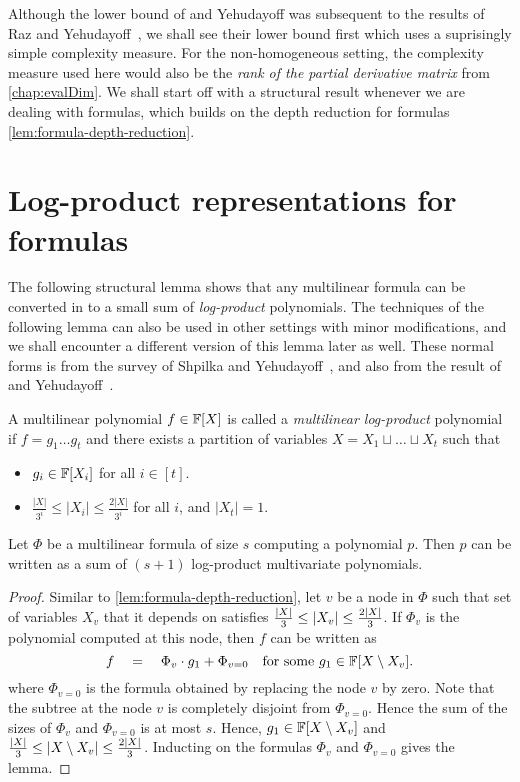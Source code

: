 Although the lower bound of \Hrubes and Yehudayoff was subsequent to the results of Raz and Yehudayoff~\cite{raz2004,raz-yehudayoff}, we shall see their lower bound first which uses a suprisingly simple complexity measure. For the non-homogeneous setting, the complexity measure used here would also be the \emph{rank of the partial derivative matrix} from \autoref{chap:evalDim}. We shall start off with a structural result whenever we are dealing with formulas, which builds on the depth reduction for formulas \autoref{lem:formula-depth-reduction}. 

\section{Log-product representations for formulas}

The following structural lemma shows that any multilinear formula can be converted in to a small sum of \emph{log-product} polynomials. 
The techniques of the following lemma can also be used in other settings with minor modifications, and we shall encounter a different version of this lemma later as well.
These normal forms is from the survey of Shpilka and Yehudayoff~\cite{sy}, and also from the result of \Hrubes and Yehudayoff~\cite{HY11a}. 

\begin{definition}\label{defn:mult-logproduct}
  A multilinear polynomial $f\in \mathbb{F}[X]$ is called a \emph{multilinear log-product} polynomial if $f = g_1\dots g_t$ and there exists a partition of variables $X = X_1 \sqcup \dots \sqcup X_t$ such that
  \begin{itemize}
  \item $g_i \in \mathbb{F}[X_i]$ for all $i \in [t]$.
  \item $\frac{|X|}{3^i} \leq |X_i| \leq \frac{2|X|}{3^i}$ for all
    $i$, and $|X_t| = 1$.
  \end{itemize}
\end{definition}

\begin{lemma}\label{lem:mult-logproduct}
  Let $\Phi$ be a multilinear formula of size $s$ computing a polynomial $p$. 
Then $p$ can be written as a sum of $(s+1)$ log-product multivariate polynomials.
\end{lemma}
\begin{proof}
  Similar to \autoref{lem:formula-depth-reduction}, let $v$ be a node in $\Phi$ such that set of variables $X_v$ that it depends on satisfies $\frac{|X|}{3} \leq \left|X_v\right| \leq \frac{2|X|}{3}$. 
If $\Phi_v$ is the polynomial computed at this node, then $f$ can be written as
  $$
  f \quad = \quad \Phi_v \cdot g_1 + \Phi_{v=0} \quad\text{for some $g_1 \in \mathbb{F}[X\setminus X_v]$}.
  $$
  where $\Phi_{v=0}$ is the formula obtained by replacing the node $v$ by zero. 
Note that the subtree at the node $v$ is completely disjoint from $\Phi_{v=0}$. 
Hence the sum of the sizes of $\Phi_v$ and $\Phi_{v=0}$ is at most $s$. 
Hence, $g_1 \in \mathbb{F}[X\setminus X_v]$ and $\frac{|X|}{3} \leq \left|X \setminus X_v\right| \leq \frac{2|X|}{3}$. 
Inducting on the formulas $\Phi_v$ and $\Phi_{v=0}$ gives the lemma.
\end{proof}


